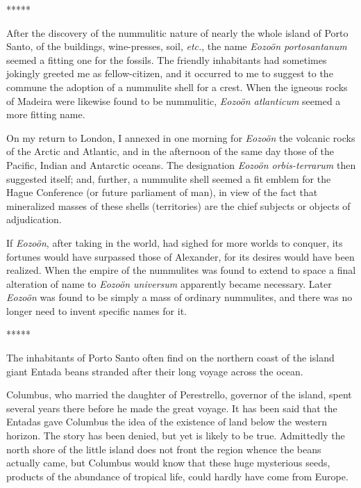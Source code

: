 \documentclass[a4paper, 12pt, oneside]{article}
\begin{document}
\centerline{*\hspace{15mm}*\hspace{15mm}*\hspace{15mm}*\hspace{15mm}*}
\bigskip

After the discovery of the nummulitic nature of nearly the whole island of Porto Santo, of the buildings, wine-presses, soil, \emph{etc.}, the name \emph{Eozoön portosantanum} seemed a fitting one for the fossils. The friendly inhabitants had sometimes jokingly greeted me as fellow-citizen, and it occurred to me to suggest to the commune the adoption of a nummulite shell for a crest. When the igneous rocks of Madeira were likewise found to be nummulitic, \emph{Eozoön atlanticum} seemed a more fitting name.

On my return to London, I annexed in one morning for \emph{Eozoön} the volcanic rocks of the Arctic and Atlantic, and in the afternoon of the same day those of the Pacific, Indian and Antarctic oceans. The designation \emph{Eozoön orbis-terrarum} then suggested itself; and, further, a nummulite shell seemed a fit emblem for the Hague Conference (or future parliament of man), in view of the fact that mineralized masses of these shells (territories) are the chief subjects or objects of adjudication.

If \emph{Eozoön}, after taking in the world, had sighed for more worlds to conquer, its fortunes would have surpassed those of Alexander, for its desires would have been realized. When the empire of the nummulites was found to extend to space a final alteration of name to \emph{Eozoön universum} apparently became necessary. Later \emph{Eozoön} was found to be simply a mass of ordinary nummulites, and there was no longer need to invent specific names for it.

\centerline{*\hspace{15mm}*\hspace{15mm}*\hspace{15mm}*\hspace{15mm}*}
\bigskip

The inhabitants of Porto Santo often find on the northern coast of the island giant Entada beans stranded after their long voyage across the ocean.

Columbus, who married the daughter of Perestrello, governor of the island, spent several years there before he made the great voyage. It has been said that the Entadas gave Columbus the idea of the existence of land below the western horizon. The story has been denied, but yet is likely to be true. Admittedly the north shore of the little island does not front the region whence the beans actually came, but Columbus would know that these huge mysterious seeds, products of the abundance of tropical life, could hardly have come from Europe.
\end{document}
